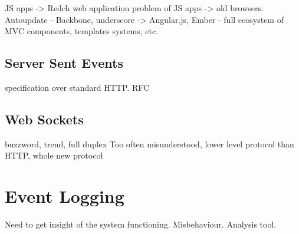 	JS apps -> Redch web application 
	problem of JS apps -> old browsers. Autoupdate
	- Backbone, underscore -> Angular.js, Ember
	- full ecosystem of MVC components, templates systems, etc.

\subsection{Server Sent Events}
specification over standard HTTP. RFC

\subsection{Web Sockets}
buzzword, trend, full duplex
Too often misunderstood, lower level protocol than HTTP, whole new protocol

\section{Event Logging}
Need to get insight of the system functioning. Misbehaviour. Analysis tool.